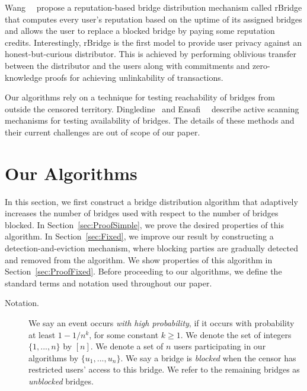 Wang~\etal~\cite{WangLBH:rBridge:13} propose a reputation-based bridge distribution mechanism called rBridge that computes every user's reputation based on the uptime of its assigned bridges and allows the user to replace a blocked bridge by paying some reputation credits. Interestingly, rBridge is the first model to provide user privacy against an honest-but-curious distributor. This is achieved by performing oblivious transfer between the distributor and the users along with commitments and zero-knowledge proofs for achieving unlinkability of transactions.

Our algorithms rely on a technique for testing reachability of bridges from outside the censored territory. Dingledine~\cite{Dingledine:BridgeReach:2011} and Ensafi~\etal~\cite{Ensafi:2014:PAM} describe active scanning mechanisms for testing availability of bridges. The details of these methods and their current challenges are out of scope of our paper.


	
\section{Our Algorithms} \label{sec:algorithm}
 In this section, we first construct a bridge distribution algorithm that adaptively increases the number of bridges used with respect to the number of bridges blocked. In Section~\ref{sec:ProofSimple}, we prove the desired properties of this algorithm. In Section~\ref{sec:Fixed}, we improve our result by constructing a detection-and-eviction mechanism, where blocking parties are gradually detected and removed from the algorithm. We show properties of this algorithm in Section~\ref{sec:ProofFixed}.
Before proceeding to our algorithms, we define the standard terms and notation used throughout our paper. 
\begin{description}
	\item[Notation.] We say an event occurs \emph{with high probability}, if it occurs with probability at least \emph{${1-1/n^k}$}, for some constant ${k \geq 1}$. We denote the set of integers ${\{1,...,n\}}$ by $[n]$. We denote a set of $n$ users participating in our algorithms by ${\{u_1,...,u_n\}}$. We say a bridge is \emph{blocked} when the censor has restricted users' access to this bridge. We refer to the remaining bridges as \emph{unblocked} bridges.
\end{description}

